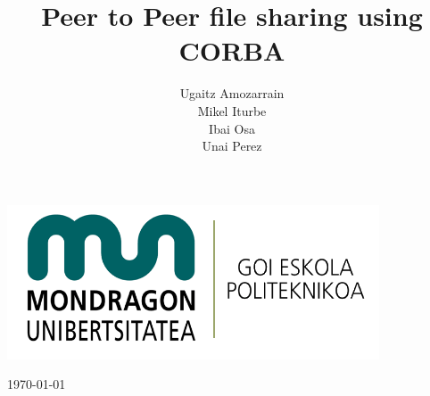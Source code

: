 \title{\textbf{Peer to Peer file sharing using CORBA}}
\author{Ugaitz Amozarrain \\ Mikel Iturbe \\ Ibai Osa \\ Unai Perez}%
\date{}

\maketitle
\begin{center}
\bigskip
 \includegraphics[scale=0.20]{irudiak/mgeplogo2.png}
\bigskip

 \today{}
\end{center}



\thispagestyle{empty} %